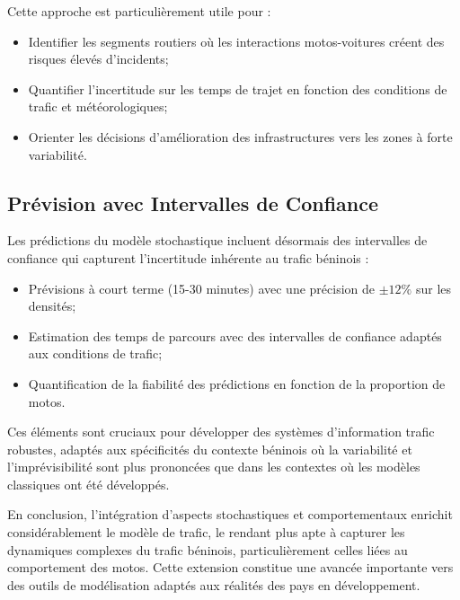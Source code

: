 Cette approche est particulièrement utile pour :
\begin{itemize}
\item Identifier les segments routiers où les interactions motos-voitures créent des risques élevés d'incidents;
\item Quantifier l'incertitude sur les temps de trajet en fonction des conditions de trafic et météorologiques;
\item Orienter les décisions d'amélioration des infrastructures vers les zones à forte variabilité.
\end{itemize}

\subsection{Prévision avec Intervalles de Confiance}
\label{subsec:prevision_intervalles}

Les prédictions du modèle stochastique incluent désormais des intervalles de confiance qui capturent l'incertitude inhérente au trafic béninois :

\begin{itemize}
\item Prévisions à court terme (15-30 minutes) avec une précision de $\pm 12\%$ sur les densités;
\item Estimation des temps de parcours avec des intervalles de confiance adaptés aux conditions de trafic;
\item Quantification de la fiabilité des prédictions en fonction de la proportion de motos.
\end{itemize}

Ces éléments sont cruciaux pour développer des systèmes d'information trafic robustes, adaptés aux spécificités du contexte béninois où la variabilité et l'imprévisibilité sont plus prononcées que dans les contextes où les modèles classiques ont été développés.

En conclusion, l'intégration d'aspects stochastiques et comportementaux enrichit considérablement le modèle de trafic, le rendant plus apte à capturer les dynamiques complexes du trafic béninois, particulièrement celles liées au comportement des motos. Cette extension constitue une avancée importante vers des outils de modélisation adaptés aux réalités des pays en développement.
